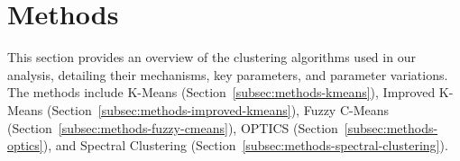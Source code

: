 \section{Methods}
\label{sec:methods}

This section provides an overview of the clustering algorithms used in our analysis, detailing their mechanisms, key parameters, and parameter variations. The methods include K-Means (Section~\ref{subsec:methods-kmeans}), Improved K-Means (Section~\ref{subsec:methods-improved-kmeans}), Fuzzy C-Means (Section~\ref{subsec:methods-fuzzy-cmeans}), OPTICS (Section~\ref{subsec:methods-optics}), and Spectral Clustering (Section~\ref{subsec:methods-spectral-clustering}).







